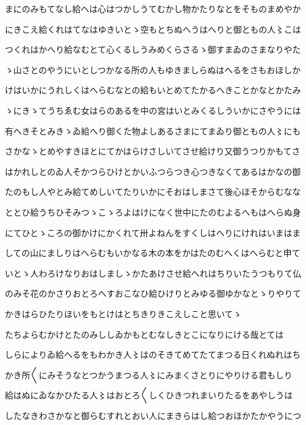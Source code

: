 \documentclass[a4paper,11pt,landscape]{ltjtarticle}
\begin{document}
\par\medskip
まにのみもてなし給へは心はつかしうてむかし物かたりなとをそものまめやか
\par\medskip
にきこえ給くれはてなはゆきいとゝ空もとちぬへうはへりと御ともの人〻こは
\par\medskip
つくれはかへり給なむとて心くるしうみめくらさるゝ御すまゐのさまなりやた
\par\medskip
ゝ山さとのやうにいとしつかなる所の人もゆきましらぬはへるをさもおほしか
\par\medskip
けはいかにうれしくはへらむなとの給もいとめてたかるへきことかなとかたみ
\par\medskip
ゝにきゝてうちゑむ女はらのあるを中の宮はいとみくるしういかにさやうには
\par\medskip
有へきそとみきゝゐ給へり御くた物よしあるさまにてまゐり御ともの人〻にも
\par\medskip
さかなゝとめやすきほとにてかはらけさしいてさせ給けり又御うつりかもてさ
\par\medskip
はかれしとのゐ人そかつらひけとかいふつらつき心つきなくてあるはかなの御
\par\medskip
たのもし人やとみ給てめしいてたりいかにそおはしまさて後心ほそからむなな
\par\medskip
ととひ給うちひそみつゝこゝろよはけになく世中にたのむよるへもはへらぬ身
\par\medskip
にてひとゝころの御かけにかくれて卅よねんをすくしはへりにけれはいまはま
\par\medskip
しての山にましりはへらむもいかなる木の本をかはたのむへくはへらむと申て
\par\medskip
いとゝ人わろけなりおはしましゝかたあけさせ給へれはちりいたうつもりて仏
\par\medskip
のみそ花のかさりおとろへすおこなひ給ひけりとみゆる御ゆかなとゝりやりて
\par\medskip
かきはらひたりほいをもとけはとちきりきこえしこと思いてゝ
\par\medskip
たちよらむかけとたのみししゐかもとむなしきとこになりにける哉とては
\par\medskip
しらによりゐ給へるをもわかき人〻はのそきてめてたてまつる日くれぬれはち
\par\medskip
かき所〱にみそうなとつかうまつる人〻にみまくさとりにやりける君もしり
\par\medskip
給はぬにゐなかひたる人〻はおとろ〱しくひきつれまいりたるをあやしうは
\par\medskip
したなきわさかなと御らむすれとおい人にまきらはし給つおほかたかやうにつ
\par\medskip
\end{document}
